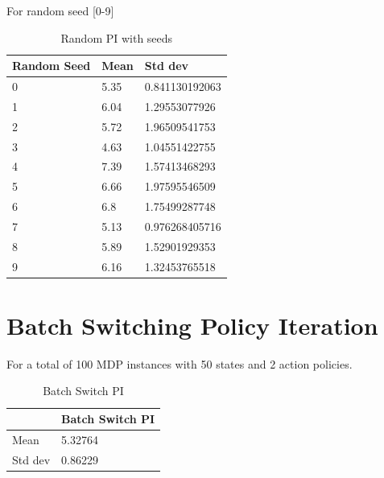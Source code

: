 \documentclass{article}
\begin{document}
For random seed [0-9]
\begin{table}[H]
\centering
\caption{Random PI with seeds}
\label{t:rpi_seeds}
\begin{tabular}{|l|l|l|}
\hline
Random Seed & Mean & Std dev        \\ \hline
0           & 5.35 & 0.841130192063 \\ \hline
1           & 6.04 & 1.29553077926  \\ \hline
2           & 5.72 & 1.96509541753  \\ \hline
3           & 4.63 & 1.04551422755  \\ \hline
4           & 7.39 & 1.57413468293  \\ \hline
5           & 6.66 & 1.97595546509  \\ \hline
6           & 6.8  & 1.75499287748  \\ \hline
7           & 5.13 & 0.976268405716 \\ \hline
8           & 5.89 & 1.52901929353  \\ \hline
9           & 6.16 & 1.32453765518  \\ \hline
\end{tabular}
\end{table}

\section{Batch Switching Policy Iteration}
For a total of 100 MDP instances with 50 states and 2 action policies.
\begin{table}[H]
\centering
\caption{Batch Switch PI}
\label{t:bspi}
\begin{tabular}{|l|l|}
\hline
        & Batch Switch PI \\ \hline
Mean    & 5.32764         \\ \hline
Std dev & 0.86229         \\ \hline
\end{tabular}
\end{table}
\end{document}
